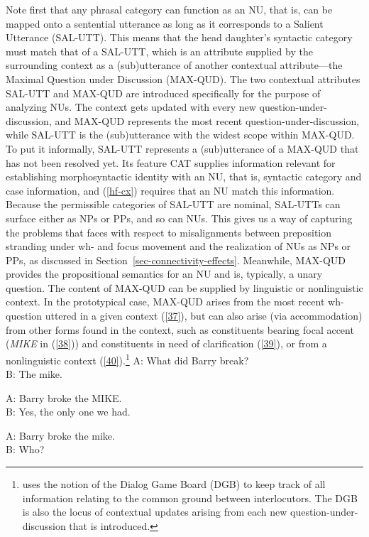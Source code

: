 \documentclass[output=paper
                ,modfonts
                ,nonflat
	        ,collection
	        ,collectionchapter
	        ,collectiontoclongg
 	        ,biblatex
                ,babelshorthands
                ,newtxmath
                ,draftmode
                ,colorlinks, citecolor=brown
]{./langsci/langscibook}
\begin{document}
{Note first that any phrasal category
can function as an NU, that is, can be mapped onto a sentential utterance as long as it corresponds to a Salient Utterance (SAL-UTT). This means that
the head daughter's syntactic category must match that of a SAL-UTT, which is an attribute supplied by the surrounding context as a (sub)utterance of another contextual attribute---the Maximal Question under Discussion (MAX-QUD). The two contextual attributes SAL-UTT and MAX-QUD are introduced specifically for the purpose of analyzing NUs. The context gets updated with every new question-under-discussion, and MAX-QUD represents the most recent question-under-discussion, while SAL-UTT is the (sub)utterance with the widest scope within MAX-QUD. To put it informally, SAL-UTT represents a (sub)utterance of a MAX-QUD that has not been resolved yet. Its feature CAT supplies information relevant for establishing morphosyntactic identity with an NU, that is, syntactic category and case information, and (\ref{hf-cx}) requires that an NU match this information. Because the permissible categories of SAL-UTT are nominal, SAL-UTTs can surface either as NPs or PPs, and so can NUs. This gives us a way of capturing the problems that \citet{Merchant2001, Merchant2005a} faces with respect to misalignments between preposition stranding under wh- and focus movement and the realization of NUs as NPs or PPs, as discussed in Section~\ref{sec-connectivity-effects}. Meanwhile, MAX-QUD provides the propositional semantics for an NU and is, typically, a unary question. The content of MAX-QUD can be supplied by linguistic or nonlinguistic context. In the prototypical case, MAX-QUD arises from the most recent wh-question uttered in a given context (\ref{37}), but can also arise (via accommodation) from other forms found in the context, such as constituents bearing focal accent ({\it MIKE} in (\ref{38})) and constituents in need of clarification (\ref{39}), or from a nonlinguistic context (\ref{40}).\footnote{\citet{Ginzburg2012} uses the notion of the Dialog Game Board (DGB) to keep track of all information relating to the common ground between interlocutors. The DGB is also the locus of contextual updates arising from each new question-under-discussion that is introduced.}
\ea
A: What did Barry break? \\
B: The mike.\label{37}
\z

\ea
A: Barry broke the MIKE. \\
B: Yes, the only one we had.\label{38}
\z

\ea
A: Barry broke the mike. \\
B: Who?\label{39}
\z

}
\end{document}
